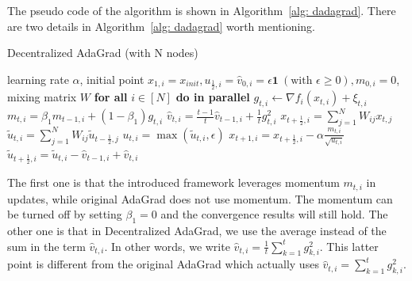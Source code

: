 \documentclass[11pt]{article}
\begin{document}
The pseudo code of the algorithm is shown in Algorithm~\ref{alg: dadagrad}. 
There are two details in Algorithm~\ref{alg: dadagrad} worth mentioning. 
\begin{algorithm}[H]
	\caption{Decentralized AdaGrad (with N nodes)}
	\label{alg: dadagrad}
	\begin{algorithmic}[1]
		 learning rate $\alpha$, initial point $x_{1,i} = x_{init}, u_{\frac{1}{2},i} = \hat v_{0,i} = \epsilon \mathbf 1\ (\text{with } \epsilon \geq 0), m_{0,i}=0$, mixing matrix $W$ 
		\STATE \textbf{for all }$i \in [N]$ \textbf{do in parallel}
 		\STATE \quad $g_{t,i}  \leftarrow \nabla f_i(x_{t,i}) + \xi_{t,i}$
 		\STATE \quad $m_{t,i} = \beta_1 m_{t-1,i} + (1-\beta_1) g_{t,i}$ 
 		\STATE \quad $ \hat v_{t,i} = \frac{t-1}{t} \hat v_{t-1,i} + \frac{1}{t} g_{t,i}^2 $
 		\STATE \quad $x_{t+\frac{1}{2},i} = \sum_{j=1}^N W_{ij}x_{t,j}$
 		\STATE \quad $\tilde u_{t,i} = \sum_{j=1}^N W_{ij}\tilde u_{t-\frac{1}{2},j}$
 	    \STATE \quad $u_{t,i} = \max(\tilde u_{t,i}, \epsilon)$
 		\STATE \quad $x_{t+1,i} = x_{t+\frac{1}{2},i} - \alpha \frac{m_{t,i}}{\sqrt{u_{t,i}}}$
 		\STATE \quad $\tilde u_{t+\frac{1}{2},i} = \tilde u_{t,i} - \hat v_{t-1,i} + \hat v_{t,i}$
 		\ENDFOR
 	\end{algorithmic}
 \end{algorithm}
 
The first one is that the introduced framework leverages momentum $m_{t,i}$ in updates, while original AdaGrad does not use momentum. 
The momentum can be turned off by setting $\beta_1 = 0$ and the convergence results will still hold. 
The other one is that in Decentralized AdaGrad, we use the average instead of the sum in the term $\hat v_{t,i}$. 
In other words, we write $\hat v_{t,i} = {\frac{1}{t}\sum_{k=1}^t g_{k,i}^2}$. 
This latter point is different from the original AdaGrad which actually uses $\hat v_{t,i} = {\sum_{k=1}^t g_{k,i}^2}$. 
\end{document}
